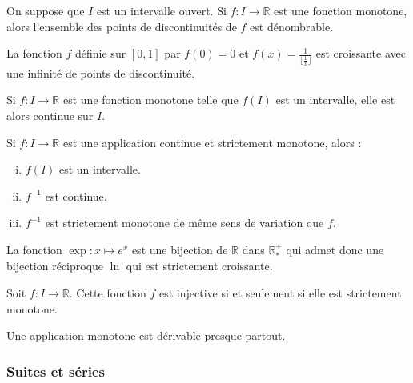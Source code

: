 	\begin{theorem}
		On suppose que $I$ est un intervalle ouvert. Si $f : I \rightarrow \mathbb{R}$ est une fonction monotone, alors l'ensemble des points de discontinuités de $f$ est dénombrable.
	\end{theorem}

	\begin{example}
		La fonction $f$ définie sur $[0,1]$ par $f(0) = 0$ et $f(x) = \frac{1}{\lfloor \frac{1}{x} \rfloor}$ est croissante avec une infinité de points de discontinuité.
	\end{example}


	\begin{proposition}
		Si $f : I \rightarrow \mathbb{R}$ est une fonction monotone telle que $f(I)$ est un intervalle, elle est alors continue sur $I$.
	\end{proposition}

	\begin{theorem}[Bijection]
		Si $f : I \rightarrow \mathbb{R}$ est une application continue et strictement monotone, alors :
		\begin{enumerate}[(i)]
			\item $f(I)$ est un intervalle.
			\item $f^{-1}$ est continue.
			\item $f^{-1}$ est strictement monotone de même sens de variation que $f$.
		\end{enumerate}
	\end{theorem}

	\begin{example}
		La fonction $\exp : x \mapsto e^x$ est une bijection de $\mathbb{R}$ dans $\mathbb{R}^{+}_{*}$ qui admet donc une bijection réciproque $\ln$ qui est strictement croissante.
	\end{example}

	\begin{proposition}
		Soit $f : I \rightarrow \mathbb{R}$. Cette fonction $f$ est injective si et seulement si elle est strictement monotone.
	\end{proposition}


	\begin{theorem}[Lebesgue]
		Une application monotone est dérivable presque partout.
	\end{theorem}

	\subsubsection{Suites et séries}

